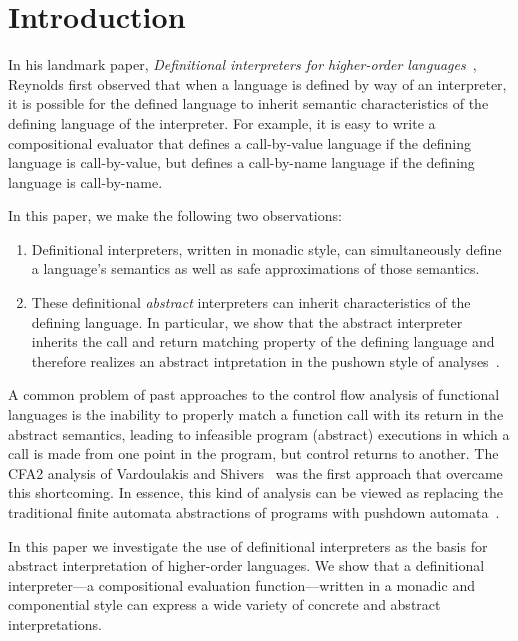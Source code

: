 \section{Introduction}

In his landmark paper, \emph{Definitional interpreters for higher-order
languages}~\cite{dvanhorn:reynolds-acm72}, Reynolds first observed that when a
language is defined by way of an interpreter, it is possible for the defined
language to inherit semantic characteristics of the defining language of the
interpreter. For example, it is easy to write a compositional evaluator that
defines a call-by-value language if the defining language is call-by-value, but
defines a call-by-name language if the defining language is call-by-name.

In this paper, we make the following two observations:
\begin{enumerate}
\item Definitional interpreters, written in monadic style, can simultaneously
define a language's semantics as well as safe approximations of those
semantics.

\item These definitional \emph{abstract} interpreters can inherit
characteristics of the defining language.  In particular, we show that the
abstract interpreter inherits the call and return matching property of the
defining language and therefore realizes an abstract intpretation in the
pushown style of
analyses~\cite{local:vardoulakis-diss12,dvanhorn:Earl2010Pushdown}.
\end{enumerate}
A common problem of past approaches to the control flow analysis of functional
languages is the inability to properly match a function call with its return in
the abstract semantics, leading to infeasible program (abstract) executions in
which a call is made from one point in the program, but control returns to
another.  The CFA2 analysis of Vardoulakis and
Shivers~\cite{dvanhorn:Vardoulakis2011CFA2} was the first approach that
overcame this shortcoming.  In essence, this kind of analysis can be viewed as
replacing the traditional finite automata abstractions of programs with
pushdown automata~\cite{dvanhorn:Earl2010Pushdown}.

In this paper we investigate the use of definitional interpreters as the basis
for abstract interpretation of higher-order languages.  We show that a
definitional interpreter---a compositional evaluation function---written in a
monadic and componential style can express a wide variety of concrete and
abstract interpretations.  
